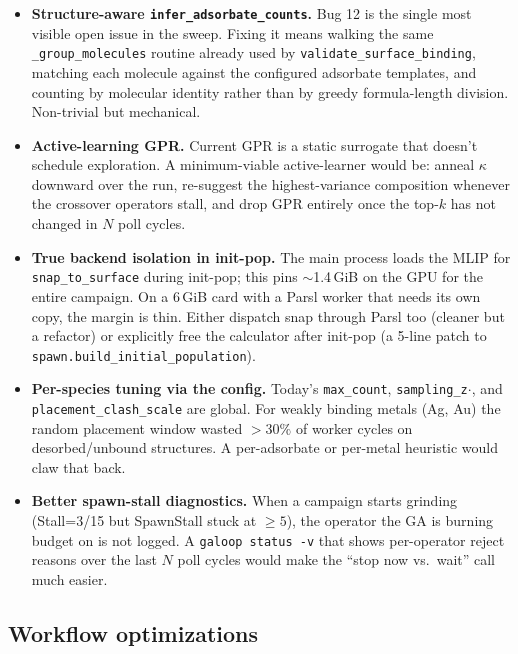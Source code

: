 \documentclass[11pt,a4paper]{article}
\begin{document}
\begin{itemize}
  \item \textbf{Structure-aware \texttt{infer\_adsorbate\_counts}.}
    Bug 12 is the single most visible open issue in the sweep.
    Fixing it means walking the same \texttt{\_group\_molecules}
    routine already used by \texttt{validate\_surface\_binding},
    matching each molecule against the configured adsorbate
    templates, and counting by molecular identity rather than by
    greedy formula-length division. Non-trivial but mechanical.
  \item \textbf{Active-learning GPR.} Current GPR is a static
    surrogate that doesn't schedule exploration. A minimum-viable
    active-learner would be: anneal $\kappa$ downward over
    the run, re-suggest the highest-variance composition whenever
    the crossover operators stall, and drop GPR entirely once the
    top-$k$ has not changed in $N$ poll cycles.
  \item \textbf{True backend isolation in init-pop.} The main
    process loads the MLIP for \texttt{snap\_to\_surface} during
    init-pop; this pins $\sim$1.4\,GiB on the GPU for the entire
    campaign. On a 6\,GiB card with a Parsl worker that needs its
    own copy, the margin is thin. Either dispatch snap through
    Parsl too (cleaner but a refactor) or explicitly free the
    calculator after init-pop (a 5-line patch to
    \texttt{spawn.build\_initial\_population}).
  \item \textbf{Per-species tuning via the config.} Today's
    \texttt{max\_count}, \texttt{sampling\_z$\cdot$}, and
    \texttt{placement\_clash\_scale} are global. For weakly
    binding metals (Ag, Au) the random placement window wasted
    $>30\%$ of worker cycles on desorbed/unbound structures. A
    per-adsorbate or per-metal heuristic would claw that back.
  \item \textbf{Better spawn-stall diagnostics.} When a campaign
    starts grinding (Stall=3/15 but SpawnStall stuck at
    $\geq 5$), the operator the GA is burning budget on is not
    logged. A \texttt{galoop status -v} that shows per-operator
    reject reasons over the last $N$ poll cycles would make the
    ``stop now vs.\ wait'' call much easier.
\end{itemize}

\subsection{Workflow optimizations}
\end{document}
